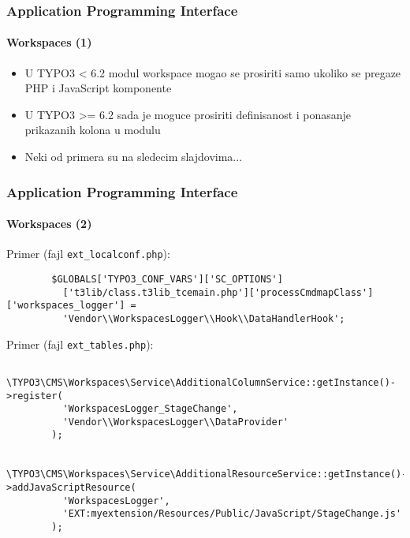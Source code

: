
\begin{frame}[fragile]
	\frametitle{Application Programming Interface}
	\framesubtitle{Workspaces (1)}

	\begin{itemize}
		\item U TYPO3 < 6.2 modul workspace mogao se prosiriti samo ukoliko se pregaze PHP i JavaScript komponente
		\item U TYPO3 >= 6.2 sada je moguce prosiriti definisanost i ponasanje prikazanih kolona u modulu
		\item Neki od primera su na sledecim slajdovima...
	\end{itemize}

\end{frame}


\begin{frame}[fragile]
	\frametitle{Application Programming Interface}
	\framesubtitle{Workspaces (2)}

	\lstset{
		basicstyle=\tiny\ttfamily
	}

	Primer (fajl \texttt{ext\_localconf.php}):

	\begin{lstlisting}
		$GLOBALS['TYPO3_CONF_VARS']['SC_OPTIONS']
		  ['t3lib/class.t3lib_tcemain.php']['processCmdmapClass']['workspaces_logger'] =
		  'Vendor\\WorkspacesLogger\\Hook\\DataHandlerHook';
	\end{lstlisting}

	Primer (fajl \texttt{ext\_tables.php}):

	\begin{lstlisting}
		\TYPO3\CMS\Workspaces\Service\AdditionalColumnService::getInstance()->register(
		  'WorkspacesLogger_StageChange',
		  'Vendor\\WorkspacesLogger\\DataProvider'
		);

		\TYPO3\CMS\Workspaces\Service\AdditionalResourceService::getInstance()->addJavaScriptResource(
		  'WorkspacesLogger',
		  'EXT:myextension/Resources/Public/JavaScript/StageChange.js'
		);
	\end{lstlisting}

\end{frame}

